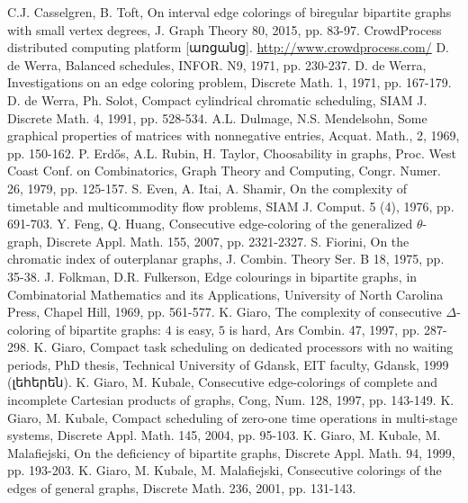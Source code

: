  C.J. Casselgren, B. Toft, On interval edge colorings of biregular bipartite graphs with small vertex degrees, J. Graph Theory 80, 2015, pp. 83-97.%
 CrowdProcess distributed computing platform [առցանց].  \url{http://www.crowdprocess.com/}
 D. de Werra, Balanced schedules, INFOR. N9, 1971, pp. 230-237.
 D. de Werra, Investigations on an edge coloring problem, Discrete Math. 1, 1971, pp. 167-179.
 D. de Werra, Ph. Solot, Compact cylindrical chromatic scheduling, SIAM J. Discrete Math. 4, 1991, pp. 528-534.
 A.L. Dulmage, N.S. Mendelsohn, Some graphical properties of matrices with nonnegative entries, Acquat. Math., 2, 1969, pp. 150-162.
 P. Erdős, A.L. Rubin, H. Taylor, Choosability in graphs, Proc. West Coast Conf. on Combinatorics, Graph Theory and Computing, Congr. Numer. 26, 1979, pp. 125-157.
 S. Even, A. Itai, A. Shamir, On the complexity of timetable and multicommodity flow problems, SIAM J. Comput. 5 (4), 1976, pp. 691-703.
 Y. Feng, Q. Huang, Consecutive edge-coloring of the generalized $\theta$-graph, Discrete Appl. Math. 155, 2007, pp. 2321-2327. %
 S. Fiorini, On the chromatic index of outerplanar graphs, J. Combin. Theory Ser. B 18, 1975, pp. 35-38. %
 J. Folkman, D.R. Fulkerson, Edge colourings in bipartite graphs, in Combinatorial  Mathematics and its Applications, University of North Carolina Press, Chapel Hill, 1969, pp. 561-577.
 K. Giaro, The complexity of consecutive $\Delta $-coloring of bipartite graphs: $4$ is easy, $5$ is hard, Ars Combin. 47, 1997, pp. 287-298.
 K. Giaro, Compact task scheduling on dedicated processors with no waiting periods, PhD thesis, Technical University of Gdansk, EIT faculty, Gdansk, 1999 (լեհերեն).
	K. Giaro, M. Kubale, Consecutive edge-colorings of complete and incomplete Cartesian products of graphs, Cong, Num. 128, 1997, pp. 143-149. 
	K. Giaro, M. Kubale, Compact scheduling of zero-one time operations in multi-stage systems, Discrete Appl. Math. 145, 2004, pp. 95-103.
 K. Giaro, M. Kubale, M. Malafiejski, On the deficiency of bipartite graphs, Discrete Appl. Math. 94, 1999, pp. 193-203.
 K. Giaro, M. Kubale, M. Malafiejski, Consecutive colorings of the edges of general graphs, Discrete Math. 236, 2001, pp. 131-143.
